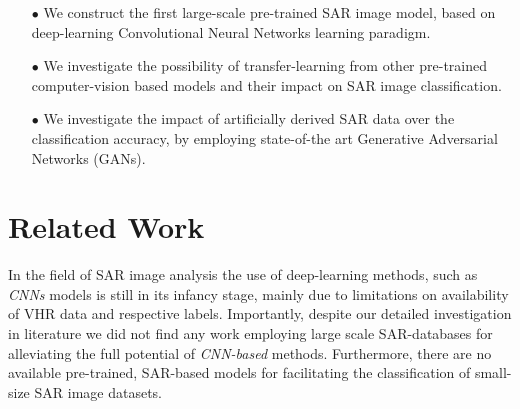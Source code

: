 \documentclass{article}
\begin{document}
\begin{itemize}  
  
  \item[$\bullet$] We construct the first large-scale pre-trained SAR image
  model, based on deep-learning Convolutional Neural Networks learning paradigm.

  \item[$\bullet$] We investigate the possibility of transfer-learning from other
  pre-trained computer-vision based models and their impact on SAR image classification.
  
  \item[$\bullet$] We investigate the impact of artificially derived SAR data over the 
  classification accuracy, by employing state-of-the art Generative Adversarial Networks (GANs).
  

\end{itemize}


\section{Related Work}
\label{sec:previous work}

In the field of SAR image analysis the use of deep-learning
methods, such as \emph{CNNs} models is still in its infancy stage, 
mainly due to limitations on availability of VHR data and 
respective labels.
%
Importantly, despite our detailed investigation in 
literature  we did not find any 
work employing large scale SAR-databases for 
alleviating the full potential of \emph{CNN-based} methods.
%
Furthermore, there are no available pre-trained, SAR-based 
models for facilitating the classification of small-size 
SAR image datasets.
    
\end{document}
